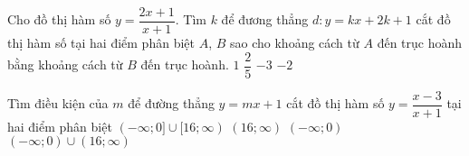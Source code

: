 \begin{ex}%
	Cho đồ thị hàm số $y=\dfrac{2x+1}{x+1}$. Tìm $k$ để đương thẳng $d\colon y=kx +2k+1$ cắt đồ thị hàm số tại hai điểm phân biệt $A$, $B$ sao cho khoảng cách từ $A$ đến trục hoành bằng khoảng cách từ $B$ đến trục hoành.
	\choice
	{$1$}
	{$\dfrac{2}{5}$}
	{\True $-3$}
	{$-2$}
\end{ex}

\begin{ex}%
	Tìm điều kiện của $m$ để đường thẳng $y=mx + 1$ cắt đồ thị hàm số $y=\dfrac{x-3}{x+1}$ tại hai điểm phân biệt
	\choice
	{$(-\infty ; 0]\cup [16;\infty )$}
	{$(16;\infty )$}
	{$(-\infty ; 0 )$}
	{\True $(-\infty ; 0)\cup (16;\infty )$}
\end{ex}

